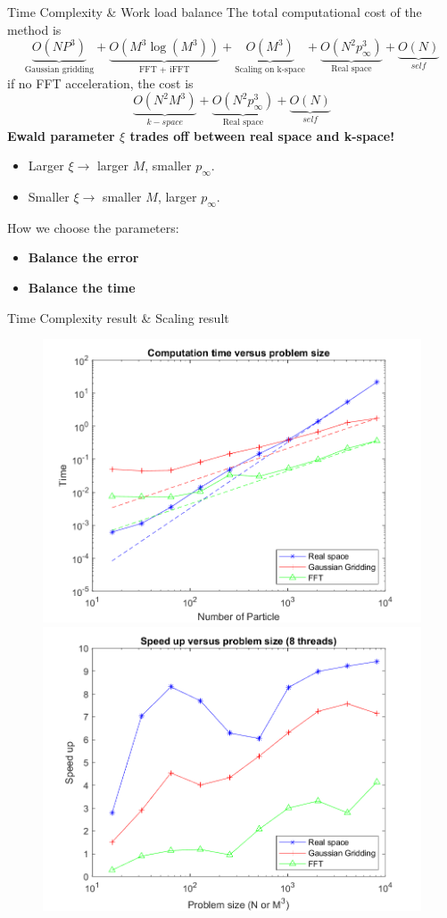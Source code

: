 \documentclass{beamer}
\begin{document}
\begin{frame}{Time Complexity \& Work load balance}
The total computational cost of the method is
\begin{equation}
\underbrace{O(NP^3)}_{\text{Gaussian gridding}} + \underbrace{O(M^3 \log(M^3))}_{\text{FFT + iFFT}} + \underbrace{O(M^3)}_{\text{Scaling on k-space}} + \underbrace{O(N^2 p_{\infty}^3)}_{\text{Real space}} + \underbrace{O(N)}_{self}
\end{equation}
if no FFT acceleration, the cost is
\begin{equation}
\underbrace{O(N^2M^3)}_{k-space} + \underbrace{O(N^2 p_{\infty}^3)}_{\text{Real space}} + \underbrace{O(N)}_{self}
\end{equation}
\textbf{Ewald parameter $\xi$ trades off between real space and k-space!}
\begin{itemize}
	\item Larger $\xi \rightarrow$ larger $M$, smaller $p_{\infty}$.
	\item Smaller $\xi \rightarrow$ smaller $M$, larger $p_{\infty}$.
\end{itemize}
How we choose the parameters:
\begin{itemize}
	\item \textbf{Balance the error} \\
	\item \textbf{Balance the time}
\end{itemize}
\end{frame}

\begin{frame}{Time Complexity result \& Scaling result}
\begin{figure}[H]\centering
	\includegraphics[width=.45\textwidth]{time_versus_np}
	\includegraphics[width=.45\textwidth]{speed_up_versus_np}
\end{figure}
\end{frame}
\end{document}
